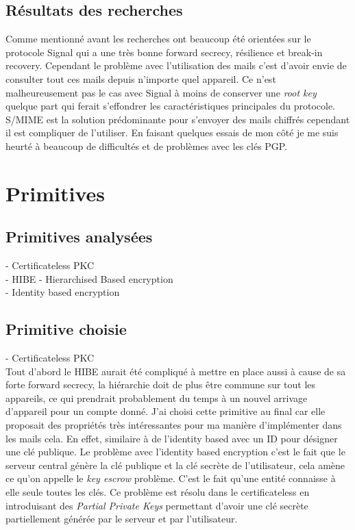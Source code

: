 \subsection{Résultats des recherches}
Comme mentionné avant les recherches ont beaucoup été orientées sur le protocole Signal qui a une très bonne forward secrecy, résilience et break-in recovery. Cependant le problème avec l'utilisation des mails c'est d'avoir envie de consulter tout ces mails depuis n'importe quel appareil. Ce n'est malheureusement pas le cas avec Signal à moins de conserver une \textit{root key} quelque part qui ferait s'effondrer les caractéristiques principales du protocole.\\
S/MIME est la solution prédominante pour s'envoyer des mails chiffrés cependant il est compliquer de l'utiliser. En faisant quelques essais de mon côté je me suis heurté à beaucoup de difficultés et de problèmes avec les clés PGP.

\section{Primitives}
\subsection{Primitives analysées}
- Certificateless PKC~\cite{DBLP:conf/asiacrypt/Al-RiyamiP03}\\
- HIBE - Hierarchised Based encryption\\
- Identity based encryption
\subsection{Primitive choisie}
- Certificateless PKC~\cite{DBLP:conf/asiacrypt/Al-RiyamiP03}\\
Tout d'abord le HIBE aurait été compliqué à mettre en place aussi à cause de sa forte forward secrecy, la hiérarchie doit de plus être commune sur tout les appareils, ce qui prendrait probablement du temps à un nouvel arrivage d'appareil pour un compte donné.
J'ai choisi cette primitive au final car elle proposait des propriétés très intéressantes pour ma manière d'implémenter dans les mails cela. En effet, similaire à de l'identity based avec un ID pour désigner une clé publique. Le problème avec l'identity based encryption c'est le fait que le serveur central génère la clé publique et la clé secrète de l'utilisateur, cela amène ce qu'on appelle le \textit{key escrow} problème. C'est le fait qu'une entité connaisse à elle seule toutes les clés. Ce problème est résolu dans le certificateless en introduisant des \textit{Partial Private Keys} permettant d'avoir une clé secrète partiellement générée par le serveur et par l'utilisateur.
